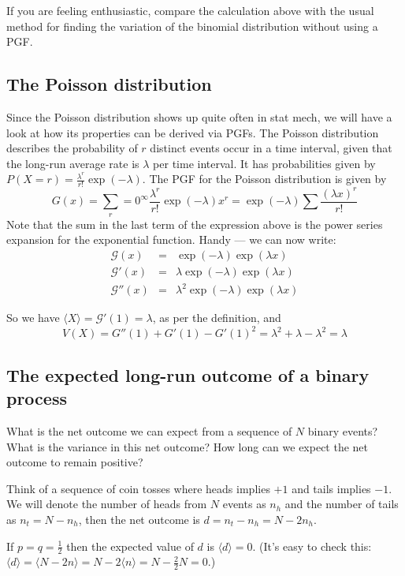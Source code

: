 \documentclass{article}
\newcommand{\calG}{\mathcal{G}}
\begin{document}
If you are feeling enthusiastic, compare the calculation above with the usual method for finding the variation of the binomial distribution without using a PGF.

\subsection*{The Poisson distribution}
Since the Poisson distribution shows up quite often in stat mech, we will have a look at how its properties can be derived via PGFs.
The Poisson distribution describes the probability of $r$ distinct events occur in a time interval, given that the long-run average rate is $\lambda$ per time interval. It has probabilities given by $P(X=r) = \frac{\lambda^r}{r!}\exp(-\lambda)$. The PGF for the Poisson distribution is given by
$$G(x) = \sum_r=0^\infty \frac{\lambda^r}{r!}\exp(-\lambda)x^r = \exp(-\lambda)\sum\frac{(\lambda x)^r}{r!}$$
Note that the sum in the last term of the expression above is the power series expansion for the exponential function. Handy --- we can now write:
\begin{eqnarray*}
\calG(x) &=& \exp(-\lambda)\exp(\lambda x)\\
\calG'(x) &=& \lambda\exp(-\lambda)\exp(\lambda x)\\
\calG''(x)&=&\lambda^2\exp(-\lambda)\exp(\lambda x)
\end{eqnarray*}

So we have $\langle X \rangle = \calG'(1) = \lambda$, as per the definition, and
$$V(X) = G''(1) + G'(1) - G'(1)^2 = \lambda^2+\lambda-\lambda^2 = \lambda$$

\subsection*{The expected long-run outcome of a binary process}
What is the net outcome we can expect from a sequence of $N$ binary events? What is the variance in this net outcome? How long can we expect the net outcome to remain positive? 

Think of a sequence of coin tosses where heads implies $+1$ and tails implies $-1$. We will denote the number of heads from $N$ events as $n_h$ and the number of tails as $n_t = N-n_h$, then the net outcome is $d = n_t-n_h = N-2n_h$. 

If $p=q=\frac12$ then the expected value of $d$ is $\langle d\rangle= 0$. (It's easy to check this: $\langle d\rangle = \langle N-2n\rangle = N-2\langle n\rangle = N-\frac{2}{2}N=0.$)
\end{document}
